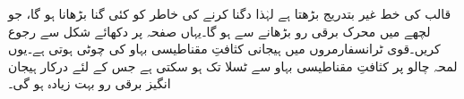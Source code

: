قالب کی   خط غیر بتدریج بڑھتا ہے لہٰذا   دگنا کرنے کی خاطر  کو کئی گنا بڑھانا ہو گا، جو لچھے میں محرک برقی رو بڑھانے سے ہو گا۔یہاں صفحہ  پر دکھائے  شکل   سے رجوع کریں۔قوی ٹرانسفارمروں میں ہیجانی کثافتِ مقناطیسی بہاو کی چوٹی  ہوتی ہے۔یوں لمحہ چالو پر  کثافتِ مقناطیسی بہاو   سے   ٹسلا تک ہو سکتی ہے جس کے لئے درکار ہیجان انگیز برقی رو بہت  زیادہ ہو گی۔

